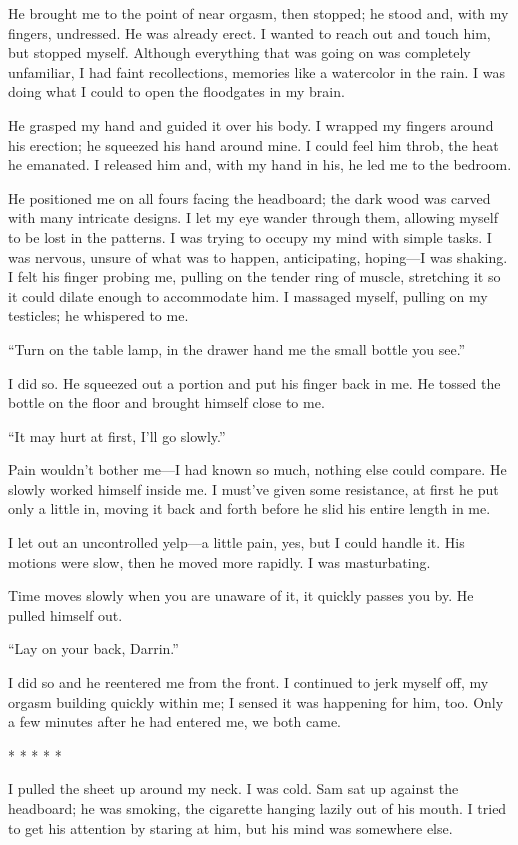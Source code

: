 He brought me to the point of near orgasm, then stopped; he stood and,
with my fingers, undressed. He was already erect. I wanted to reach out
and touch him, but stopped myself. Although everything that was going on
was completely unfamiliar, I had faint recollections, memories like a
watercolor in the rain. I was doing what I could to open the floodgates
in my brain.

He grasped my hand and guided it over his body. I wrapped my fingers
around his erection; he squeezed his hand around mine. I could feel him
throb, the heat he emanated. I released him and, with my hand in his, he
led me to the bedroom.

He positioned me on all fours facing the headboard; the dark wood was
carved with many intricate designs. I let my eye wander through them,
allowing myself to be lost in the patterns. I was trying to occupy my
mind with simple tasks. I was nervous, unsure of what was to happen,
anticipating, hoping---I was shaking. I felt his finger probing me,
pulling on the tender ring of muscle, stretching it so it could dilate
enough to accommodate him. I massaged myself, pulling on my testicles;
he whispered to me.

``Turn on the table lamp, in the drawer hand me the small bottle you
see.''

I did so. He squeezed out a portion and put his finger back in me. He
tossed the bottle on the floor and brought himself close to me.

``It may hurt at first, I'll go slowly.''

Pain wouldn't bother me---I had known so much, nothing else could
compare. He slowly worked himself inside me. I must've given some
resistance, at first he put only a little in, moving it back and forth
before he slid his entire length in me.

I let out an uncontrolled yelp---a little pain, yes, but I could handle
it. His motions were slow, then he moved more rapidly. I was
masturbating.

Time moves slowly when you are unaware of it, it quickly passes you by.
He pulled himself out.

``Lay on your back, Darrin.''

I did so and he reentered me from the front. I continued to jerk myself
off, my orgasm building quickly within me; I sensed it was happening for
him, too. Only a few minutes after he had entered me, we both came.

* * * * *

I pulled the sheet up around my neck. I was cold. Sam sat up against the
headboard; he was smoking, the cigarette hanging lazily out of his
mouth. I tried to get his attention by staring at him, but his mind was
somewhere else.

